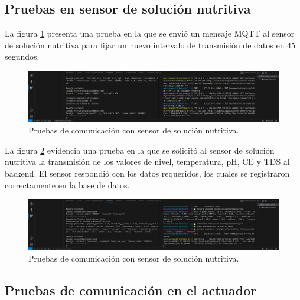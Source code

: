 \subsection{Pruebas en sensor de solución nutritiva}

La figura \ref{fig:prueba_mqtt_sensor_solucion_nutritiva_1} presenta una prueba
en la que se envió un mensaje MQTT al sensor de solución nutritiva para fijar
un nuevo intervalo de transmisión de datos en 45 segundos.

\begin{figure}[H]
    \centering
    \includegraphics[width=\textwidth]{Images/57_prueba_mqtt_sensor_solucion_nutritiva_1.png}
    \caption[Pruebas de comunicación con sensor de solución nutritiva]{Pruebas de comunicación con sensor de solución nutritiva.}
    \label{fig:prueba_mqtt_sensor_solucion_nutritiva_1}
\end{figure}

La figura \ref{fig:prueba_mqtt_sensor_solucion_nutritiva_2} evidencia una
prueba en la que se solicitó al sensor de solución nutritiva la transmisión de
los valores de nivel, temperatura, pH, CE y TDS al backend. El sensor respondió
con los datos requeridos, los cuales se registraron correctamente en la base de
datos.

\begin{figure}[H]
    \centering
    \includegraphics[width=\textwidth]{Images/57_prueba_mqtt_sensor_solucion_nutritiva_2.png}
    \caption[Pruebas de comunicación con sensor de solución nutritiva]{Pruebas de comunicación con sensor de solución nutritiva.}
    \label{fig:prueba_mqtt_sensor_solucion_nutritiva_2}
\end{figure}

\subsection{Pruebas de comunicación en el actuador}

